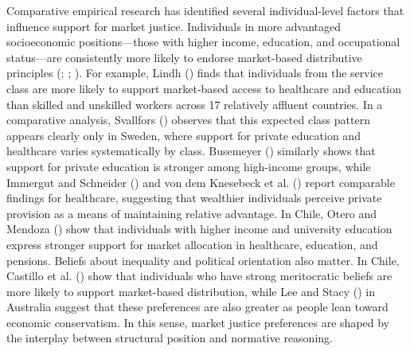 \documentclass[
  13pt,
]{article}
\begin{document}
Comparative empirical research has identified several individual-level
factors that influence support for market justice. Individuals in more
advantaged socioeconomic positions---those with higher income,
education, and occupational status---are consistently more likely to
endorse market-based distributive principles
(;
;
). For example,
Lindh () finds that individuals
from the service class are more likely to support market-based access to
healthcare and education than skilled and unskilled workers across 17
relatively affluent countries. In a comparative analysis, Svallfors
() observes that this
expected class pattern appears clearly only in Sweden, where support for
private education and healthcare varies systematically by class.
Busemeyer () similarly shows
that support for private education is stronger among high-income groups,
while Immergut and Schneider () and
von dem Knesebeck et al. ()
report comparable findings for healthcare, suggesting that wealthier
individuals perceive private provision as a means of maintaining
relative advantage. In Chile, Otero and Mendoza
() show that individuals with
higher income and university education express stronger support for
market allocation in healthcare, education, and pensions. Beliefs about
inequality and political orientation also matter. In Chile, Castillo et
al. () show that
individuals who have strong meritocratic beliefs are more likely to
support market-based distribution, while Lee and Stacy
() in Australia suggest that these
preferences are also greater as people lean toward economic
conservatism. In this sense, market justice preferences are shaped by
the interplay between structural position and normative reasoning.
\end{document}
